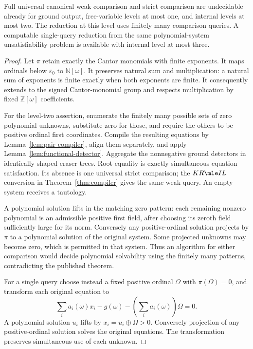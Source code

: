 \begin{theorem}
\label{thm:functional-hardness}
Full universal canonical weak comparison and strict comparison are
undecidable already for ground output, free-variable levels at most one,
and internal levels at most two.  The reduction at this level uses finitely
many comparison queries.  A computable single-query reduction from the
same polynomial-system unsatisfiability problem is available with internal
level at most three.
\end{theorem}
\begin{proof}
Let $\pi$ retain exactly the Cantor monomials with finite exponents.
It maps ordinals below $\varepsilon_0$ to $\mathbb N[\omega]$.
It preserves natural sum and multiplication: a natural sum of exponents
is finite exactly when both exponents are finite.  It consequently extends
to the signed Cantor-monomial group and respects multiplication by fixed
$\mathbb Z[\omega]$ coefficients.

For the level-two assertion, enumerate the finitely many possible sets of
zero polynomial unknowns, substitute zero for those, and require the others
to be positive ordinal first coordinates.  Compile the resulting equations
by Lemma~\ref{lem:pair-compiler}, align them separately, and apply
Lemma~\ref{lem:functional-detector}.  Aggregate the nonnegative ground
detectors in identically shaped eraser trees.  Root equality is exactly
simultaneous equation satisfaction.  Its absence is one universal strict
comparison; the $KR\mle IL$ conversion in Theorem~\ref{thm:compiler}
gives the same weak query.  An empty system receives a tautology.

A polynomial solution lifts in the matching zero pattern: each remaining
nonzero polynomial is an admissible positive first field, after choosing its
zeroth field sufficiently large for its norm.  Conversely any positive-ordinal
solution projects by $\pi$ to a polynomial solution of the original system.
Some projected unknowns may become zero, which is permitted in that system.
Thus an algorithm for either comparison would decide polynomial solvability
using the finitely many patterns, contradicting the published theorem.

For a single query choose instead a fixed positive ordinal $\Omega$ with
$\pi(\Omega)=0$, and transform each original equation to
\[
 \sum_i a_i(\omega)x_i-g(\omega)
                    -\left(\sum_i a_i(\omega)\right)\Omega=0.
\]
A polynomial solution $u_i$ lifts by $x_i=u_i\oplus\Omega>0$.
Conversely projection of any positive-ordinal solution solves the original
equations.  The transformation preserves simultaneous use of each unknown.


\end{proof}

